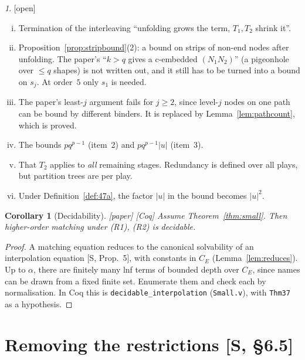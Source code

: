 \documentclass[11pt]{article}
\newcommand{\CE}{C_E}
\newcommand{\Paper}{\textsf{[paper]}}
\newcommand{\Open}{\textsf{\color{red!60!black}[open]}}
\newcommand{\Coq}{\textsf{[Coq]}}
\theoremstyle{plain}
\newtheorem{corollary}[theorem]{Corollary}
\theoremstyle{definition}
\theoremstyle{remark}
\newtheorem*{gapenv}{\gapname}
\newcommand{\gapname}{Gap}
\begin{document}
\renewcommand{\gapname}{[Gap-Counting]}
\begin{gapenv}\label{gap:count}
\Open{}
\begin{enumerate}[(i)]
\item Termination of the interleaving ``unfolding grows the term,
  $T_1,T_2$ shrink it''.
\item Proposition~\ref{prop:stripbound}(2): a bound on strips of
  non-end nodes after unfolding.  The paper's ``$k>q$ gives a
  c-embedded $(N_1N_2)$'' (a pigeonhole over $\le q$ shapes) is not
  written out, and it still has to be turned into a bound on $s_j$.
  At order~$5$ only $s_1$ is needed.
\item The paper's least-$j$ argument fails for $j\ge2$, since level-$j$
  nodes on one path can be bound by different binders.  It is replaced
  by Lemma~\ref{lem:pathcount}, which is proved.
\item The bounds $pq^{p-1}$ (item~2) and $pq^{p-1}|u|$ (item~3).
\item That $T_2$ applies to \emph{all} remaining stages.  Redundancy is
  defined over all plays, but partition trees are per play.
\item Under Definition~\ref{def:47a}, the factor $|u|$ in the bound
  becomes $|u|^2$.
\end{enumerate}
\end{gapenv}

\begin{corollary}[Decidability]\label{cor:decidable}
\Paper{} \Coq{} Assume Theorem~\ref{thm:small}.  Then higher-order
matching under (R1), (R2) is decidable.
\end{corollary}
\begin{proof}
A matching equation reduces to the canonical solvability of an
interpolation equation [S, Prop.~5], with constants in $\CE$
(Lemma~\ref{lem:reduces}).  Up to $\alpha$, there are finitely many lnf
terms of bounded depth over $\CE$, since names can be drawn from a
fixed finite set.  Enumerate them and check each by normalisation.  In
Coq this is \texttt{decidable\_interpolation} (\texttt{Small.v}), with
\texttt{Thm37} as a hypothesis.
\end{proof}

\section{Removing the restrictions [S, \S6.5]}\label{sec:restrictions}
\end{document}
